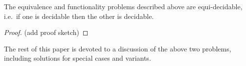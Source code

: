 \begin{fact}\label{fact:uniqueness}
    The equivalence and functionality problems described above are equi-decidable, i.e.~if one is decidable then the other is decidable. 
\end{fact}
\begin{proof}
    (add proof sketch)
\end{proof}

The rest of this paper is devoted to a discussion of the above two problems, including solutions for special cases and variants.
